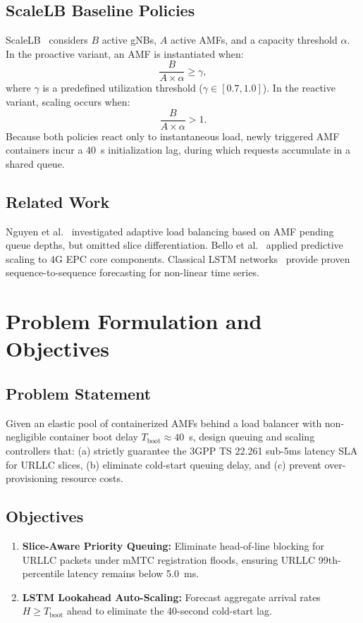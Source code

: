\documentclass[conference]{IEEEtran}
\begin{document}
\subsection{ScaleLB Baseline Policies}
ScaleLB~\cite{scalelb} considers $B$ active gNBs, $A$ active AMFs, and a capacity threshold $\alpha$. In the proactive variant, an AMF is instantiated when:
\begin{equation}
\frac{B}{A \times \alpha} \ge \gamma,
\label{eq:pro}
\end{equation}
where $\gamma$ is a predefined utilization threshold ($\gamma \in [0.7, 1.0]$). In the reactive variant, scaling occurs when:
\begin{equation}
\frac{B}{A \times \alpha} > 1.
\label{eq:react}
\end{equation}
Because both policies react only to instantaneous load, newly triggered AMF containers incur a 40~s initialization lag, during which requests accumulate in a shared queue.

\subsection{Related Work}
Nguyen et al.~\cite{nguyen} investigated adaptive load balancing based on AMF pending queue depths, but omitted slice differentiation. Bello et al.~\cite{bello} applied predictive scaling to 4G EPC core components. Classical LSTM networks~\cite{lstm} provide proven sequence-to-sequence forecasting for non-linear time series.

\section{Problem Formulation and Objectives}
\subsection{Problem Statement}
Given an elastic pool of containerized AMFs behind a load balancer with non-negligible container boot delay $T_{\text{boot}} \approx 40$~s, design queuing and scaling controllers that: (a) strictly guarantee the 3GPP TS 22.261 sub-5ms latency SLA for URLLC slices, (b) eliminate cold-start queuing delay, and (c) prevent over-provisioning resource costs.

\subsection{Objectives}
\begin{enumerate}
  \item[\textbf{O1}] \textbf{Slice-Aware Priority Queuing:} Eliminate head-of-line blocking for URLLC packets under mMTC registration floods, ensuring URLLC 99th-percentile latency remains below 5.0~ms.
  \item[\textbf{O2}] \textbf{LSTM Lookahead Auto-Scaling:} Forecast aggregate arrival rates $H \ge T_{\text{boot}}$ ahead to eliminate the 40-second cold-start lag.
\end{enumerate}
\end{document}
